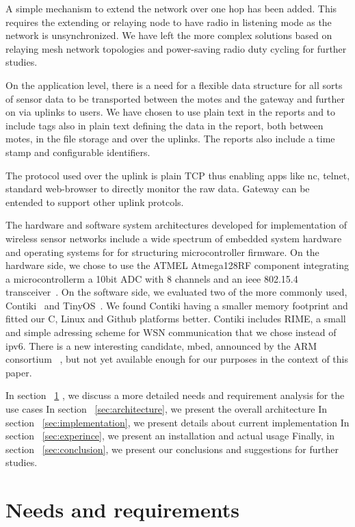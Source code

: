 \documentclass[conference, a4paper,10pt,twocolumn]{IEEEtran}
\begin{document}
A simple mechanism to extend the network over one hop has been added.
This requires the extending or relaying node to have radio in listening 
mode as the network is unsynchronized. We have left the more complex 
solutions based on relaying mesh network topologies and power-saving 
radio duty cycling for further studies.

On the application level, there is a need for a flexible data structure 
for all sorts of sensor data to be transported between the motes and the 
gateway and further on via uplinks to users. We have chosen to use plain 
text in the reports and to include tags also in plain text defining the 
data in the report, both between motes, in the file storage and over the 
uplinks. The reports also include a time stamp and configurable 
identifiers. 

The protocol used over the uplink is plain TCP thus enabling apps like 
nc, telnet, standard web-browser to directly monitor the raw data.
Gateway can be entended to support other uplink protcols.

The hardware and software system architectures developed for 
implementation of wireless sensor networks include a wide spectrum of 
embedded system hardware and operating systems for for structuring 
microcontroller firmware.
On the hardware side, we chose to use the ATMEL Atmega128RF component 
integrating a microcontrollerm a 10bit ADC with 8 channels and an ieee 
802.15.4 transceiver~\cite{ATMEGA}.
On the software side, we evaluated two of the more commonly used, 
Contiki~\cite{CONTIKI} and TinyOS~\cite{tinyos}. We found Contiki having 
a smaller memory footprint and fitted our C, Linux and Github platforms 
better. Contiki includes RIME, a small and simple adressing scheme for 
WSN communication that we chose instead of ipv6. There is a new 
interesting candidate, mbed, announced by the ARM consortium 
~\cite{mbed}, but not yet available enough for our purposes in the 
context of this paper.


In section ~\ref{sec:needs} , we discuss a more detailed needs and requirement analysis for the use cases
In section ~\ref{sec:architecture}, we present the overall architecture
In section ~\ref{sec:implementation}, we present details about current implementation  
In section ~\ref{sec:experince}, we present an installation and actual usage
Finally, in section ~\ref{sec:conclusion}, we present our conclusions and suggestions for further studies.
\section{Needs and requirements}
\label{sec:needs}
\end{document}
